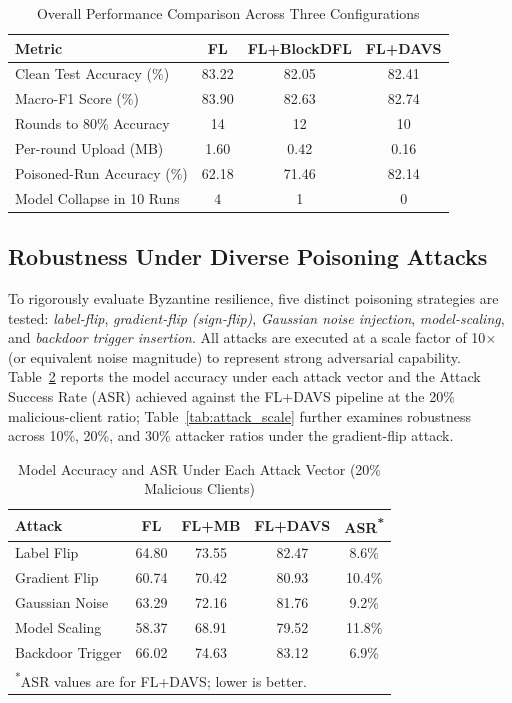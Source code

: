 \documentclass[conference]{IEEEtran}
\begin{document}
\begin{table}[!t]
\centering
\caption{Overall Performance Comparison Across Three Configurations}
\begin{tabular}{|l|c|c|c|}
\hline
Metric & FL & FL+BlockDFL & FL+DAVS \\
\hline
Clean Test Accuracy (\%) & 83.22 & 82.05 & 82.41 \\
Macro-F1 Score (\%) & 83.90 & 82.63 & 82.74 \\
Rounds to 80\% Accuracy & 14 & 12 & 10 \\
Per-round Upload (MB) & 1.60 & 0.42 & 0.16 \\
Poisoned-Run Accuracy (\%) & 62.18 & 71.46 & 82.14 \\
Model Collapse in 10 Runs & 4 & 1 & 0 \\
\hline
\end{tabular}
\label{tab:primary_compare}
\end{table}

\subsection{Robustness Under Diverse Poisoning Attacks}
To rigorously evaluate Byzantine resilience, five distinct poisoning strategies are tested: \textit{label-flip}, \textit{gradient-flip (sign-flip)}, \textit{Gaussian noise injection}, \textit{model-scaling}, and \textit{backdoor trigger insertion}. All attacks are executed at a scale factor of 10$\times$ (or equivalent noise magnitude) to represent strong adversarial capability. Table~\ref{tab:attack_20} reports the model accuracy under each attack vector and the Attack Success Rate (ASR) achieved against the FL+DAVS pipeline at the 20\% malicious-client ratio; Table~\ref{tab:attack_scale} further examines robustness across 10\%, 20\%, and 30\% attacker ratios under the gradient-flip attack.

\begin{table}[!t]
\centering
\caption{Model Accuracy and ASR Under Each Attack Vector (20\% Malicious Clients)}
\begin{tabular}{|l|c|c|c|c|}
\hline
Attack & FL & FL+MB & FL+DAVS & ASR\textbf{\textsuperscript{*}} \\
\hline
Label Flip        & 64.80 & 73.55 & 82.47 & 8.6\% \\
Gradient Flip     & 60.74 & 70.42 & 80.93 & 10.4\% \\
Gaussian Noise    & 63.29 & 72.16 & 81.76 & 9.2\% \\
Model Scaling     & 58.37 & 68.91 & 79.52 & 11.8\% \\
Backdoor Trigger  & 66.02 & 74.63 & 83.12 &  6.9\% \\
\hline
\multicolumn{5}{l}{\footnotesize \textsuperscript{*}ASR values are for FL+DAVS; lower is better.} \\
\end{tabular}
\label{tab:attack_20}
\end{table}
\end{document}
